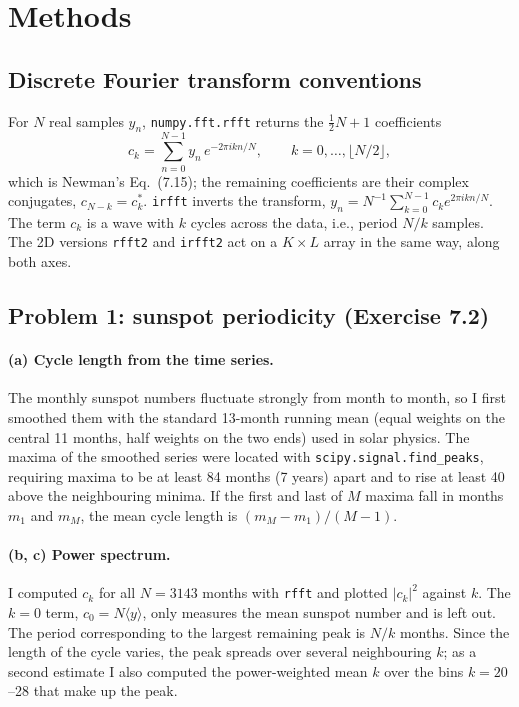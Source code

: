 \documentclass[11pt]{article}
\newcommand{\code}[1]{\texttt{#1}}
\begin{document}
\section*{Methods}

\subsection*{Discrete Fourier transform conventions}

For $N$ real samples $y_n$, \code{numpy.fft.rfft} returns the
$\tfrac12N+1$ coefficients
\[
c_k = \sum_{n=0}^{N-1} y_n\, e^{-2\pi i kn/N}, \qquad k = 0,\dots,\lfloor N/2\rfloor,
\]
which is Newman's Eq.~(7.15); the remaining coefficients are their complex
conjugates, $c_{N-k}=c_k^*$. \code{irfft} inverts the transform,
$y_n = N^{-1}\sum_{k=0}^{N-1} c_k e^{2\pi ikn/N}$. The term $c_k$ is a wave with
$k$ cycles across the data, i.e., period $N/k$ samples. The 2D versions
\code{rfft2} and \code{irfft2} act on a $K\times L$ array in the same way, along
both axes.

\subsection*{Problem 1: sunspot periodicity (Exercise 7.2)}

\paragraph{(a) Cycle length from the time series.}
The monthly sunspot numbers fluctuate strongly from month to month, so I first
smoothed them with the standard 13-month running mean (equal weights on the
central 11 months, half weights on the two ends) used in solar physics. The
maxima of the smoothed series were located with \code{scipy.signal.find\_peaks},
requiring maxima to be at least 84 months (7 years) apart and to rise at least
40 above the neighbouring minima. If the first and last of $M$ maxima fall in
months $m_1$ and $m_M$, the mean cycle length is $(m_M-m_1)/(M-1)$.

\paragraph{(b, c) Power spectrum.}
I computed $c_k$ for all $N=3143$ months with \code{rfft} and plotted
$|c_k|^2$ against $k$. The $k=0$ term, $c_0 = N\langle y\rangle$, only measures
the mean sunspot number and is left out. The period corresponding to the
largest remaining peak is $N/k$ months. Since the length of the cycle varies,
the peak spreads over several neighbouring $k$; as a second estimate I also
computed the power-weighted mean $k$ over the bins $k=20$--28 that make up the
peak.
\end{document}
